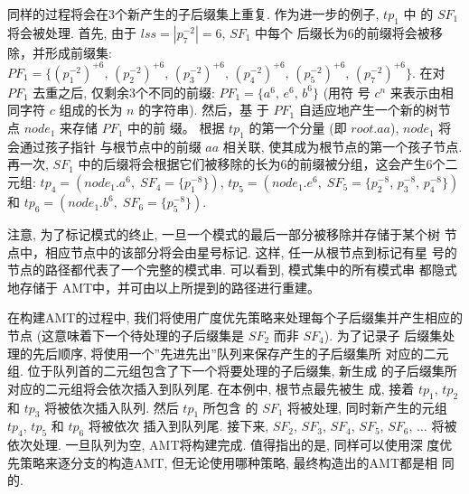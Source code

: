 同样的过程将会在3个新产生的子后缀集上重复. 作为进一步的例子, $tp_1$ 中
的 $SF_1$ 将会被处理. 首先, 由于 $lss = |p_7^{-2}| = 6$, $SF_1$ 中每个
后缀长为6的前缀将会被移除，并形成前缀集:
$PF_1 = \{(p_1^{-2})^{+6},\, (p_2^{-2})^{+6},\, (p_3^{-2})^{+6},\,
(p_4^{-2})^{+6},\, (p_5^{-2})^{+6},\, (p_7^{-2})^{+6}\}$. 在对 $PF_1$
去重之后, 仅剩余3个不同的前缀: $PF_1 = \{a^6,\, e^6,\, b^6\}$ (用符
号 $c^n$ 来表示由相同字符 $c$ 组成的长为 $n$ 的字符串).  然后，基
于 $PF_1$ 自适应地产生一个新的树节点 $node_1$ 来存储 $PF_1$ 中的前
缀。 根据 $tp_1$ 的第一个分量 (即 $root.aa$), $node_1$ 将会通过孩子指针
与根节点中的前缀 $aa$ 相关联, 使其成为根节点的第一个孩子节点. 再一次,
$SF_1$ 中的后缀将会根据它们被移除的长为6的前缀被分组，这会产生6个二元组:
$tp_4 = (node_1.a^6,\; SF_4=\{p_1^{-8}\})$,
$tp_5 = (node_1.e^6,\; SF_5=\{p_2^{-8},\, p_3^{-8},\,
p_4^{-8}\})$ 和 $tp_6 = (node_1.b^6,\; SF_6=\{p_5^{-8}\})$.

注意, 为了标记模式的终止, 一旦一个模式的最后一部分被移除并存储于某个树
节点中，相应节点中的该部分将会由星号标记. 这样, 任一从根节点到标记有星
号的节点的路径都代表了一个完整的模式串. 可以看到, 模式集中的所有模式串
都隐式地存储于 AMT中，并可由以上所提到的路径进行重建。

在构建AMT的过程中, 我们将使用广度优先策略来处理每个子后缀集并产生相应的
节点 (这意味着下一个待处理的子后缀集是 $SF_2$ 而非 $SF_4$). 为了记录子
后缀集处理的先后顺序, 将使用一个''先进先出''队列来保存产生的子后缀集所
对应的二元组. 位于队列首的二元组包含了下一个将要处理的子后缀集, 新生成
的子后缀集所对应的二元组将会依次插入到队列尾. 在本例中, 根节点最先被生
成, 接着 $tp_1$, $tp_2$ 和 $tp_3$ 将被依次插入队列. 然后 $tp_1$ 所包含
的 $SF_1$ 将被处理, 同时新产生的元组 $tp_4$, $tp_5$ 和 $tp_6$ 将被依次
插入到队列尾. 接下来, $SF_2$, $SF_3$, $SF_4$, $SF_5$, $SF_6$, $\dots$
将被依次处理. 一旦队列为空, AMT将构建完成. 值得指出的是, 同样可以使用深
度优先策略来逐分支的构造AMT, 但无论使用哪种策略, 最终构造出的AMT都是相
同的.


